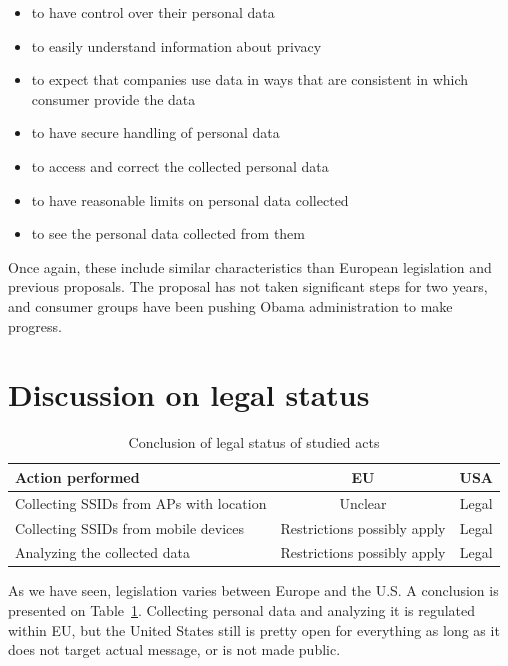 \documentclass[12pt,a4paper,oneside,pdftex]{report}
\begin{document}
\begin{itemize}
    \item to have control over their personal data
    \item to easily understand information about privacy
    \item to expect that companies use data in ways that are consistent in which consumer provide the data
    \item to have secure handling of personal data
    \item to access and correct the collected personal data
    \item to have reasonable limits on personal data collected
    \item to see the personal data collected from them
\end{itemize}

Once again, these include similar characteristics than European legislation and previous proposals. The proposal has not taken significant steps for two years, and consumer groups have been pushing Obama administration to make progress.~\cite{law360_groups}

\section{Discussion on legal status}

\begin{table}[h]
\center
    \begin{tabular}{|l|c|c|}
        \hline
        \textbf{Action performed} & \textbf{EU} & \textbf{USA} \\ \hline
        Collecting SSIDs from APs with location & Unclear & Legal \\ 
        \hline
        Collecting SSIDs from mobile devices & Restrictions possibly apply & Legal \\ 
        \hline
        Analyzing the collected data & Restrictions possibly apply & Legal \\ \hline
    \end{tabular}
    \caption{Conclusion of legal status of studied acts}
    \label{table:conclusion}
\end{table}

As we have seen, legislation varies between Europe and the U.S. A conclusion is presented on Table~\ref{table:conclusion}. Collecting personal data and analyzing it is regulated within EU, but the United States still is pretty open for everything as long as it does not target actual message, or is not made public.
\end{document}
